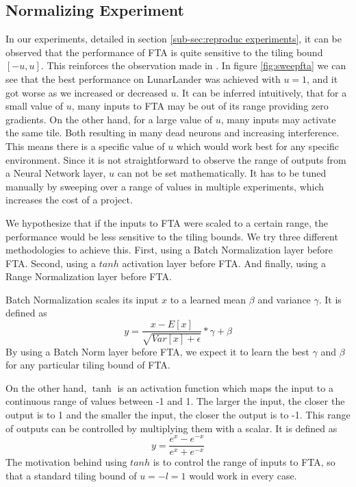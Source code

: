 \documentclass{article}
\begin{document}
\subsection{Normalizing Experiment} \label{sub-sec:normalize experiments}
In our experiments, detailed in section \ref{sub-sec:reproduc experiments}, it can be observed that the performance of FTA is quite sensitive to the tiling bound $[-u, u]$.
This reinforces the observation made in \cite{pan2019fuzzy}.
In figure \ref{fig:sweepfta} we can see that the best performance on LunarLander was achieved with $u=1$, and it got worse as we increased or decreased $u$.
It can be inferred intuitively, that for a small value of $u$, many inputs to FTA may be out of its range providing zero gradients.
On the other hand, for a large value of $u$, many inputs may activate the same tile.
Both resulting in many dead neurons and increasing interference.
This means there is a specific value of $u$ which would work best for any specific environment.
Since it is not straightforward to observe the range of outputs from a Neural Network layer, $u$ can not be set mathematically.
It has to be tuned manually by sweeping over a range of values in multiple experiments, which increases the cost of a project.

We hypothesize that if the inputs to FTA were scaled to a certain range, the performance would be less sensitive to the tiling bounds.
We try three different methodologies to achieve this.
First, using a Batch Normalization \cite[]{ioffe2015batch} layer before FTA.
Second, using a $tanh$ activation layer before FTA.
And finally, using a Range Normalization layer before FTA.

Batch Normalization scales its input $x$ to a learned mean $\beta$ and variance $\gamma$.
It is defined as
\begin{equation}
    y = \frac{x-E[x]}{\sqrt{Var[x] + \epsilon}} * \gamma + \beta
    \label{eq:batchnorm}
\end{equation}
By using a Batch Norm layer before FTA, we expect it to learn the best $\gamma$ and $\beta$ for any particular tiling bound of FTA.

On the other hand, $\tanh$ is an activation function which maps the input to a continuous range of values between -1 and 1.
The larger the input, the closer the output is to 1 and the smaller the input, the closer the output is to -1.
This range of outputs can be controlled by multiplying them with a scalar.
It is defined as
 \begin{equation}
    y = \frac{e^x-e^{-x}}{e^x+e^{-x}}
    \label{eq:tanh}
 \end{equation}
The motivation behind using $tanh$ is to control the range of inputs to FTA, so that a standard tiling bound of $u = -l = 1$ would work in every case.
\end{document}
